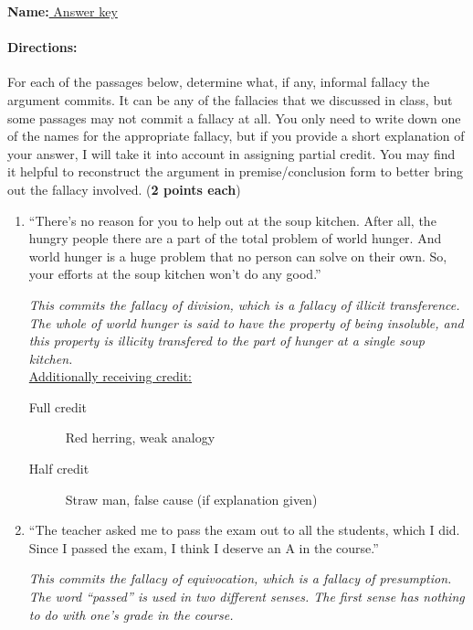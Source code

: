 \documentclass[10pt]{article}
\begin{document}
\textbf{Name:}\underline{  Answer key  }

\paragraph{Directions:} For each of the passages below, determine what, if any, informal fallacy the argument commits.  It can be any of the fallacies that we discussed in class, but some passages may not commit a fallacy at all.  You only need to write down one of the names for the appropriate fallacy, but if you provide a short explanation of your answer, I will take it into account in assigning partial credit.  You may find it helpful to reconstruct the argument in premise/conclusion form to better bring out the fallacy involved. (\textbf{2 points each})

\begin{enumerate}
  \setlength\itemsep{25pt}

  \item ``There's no reason for you to help out at the soup kitchen.  After all, the hungry people there are a part of the total problem of world hunger.  And world hunger is a huge problem that no person can solve on their own. So, your efforts at the soup kitchen won't do any good.''
  
  \textit{This commits the fallacy of division, which is a fallacy of illicit transference.  The whole of world hunger is said to have the property of being insoluble, and this property is illicity transfered to the part of hunger at a single soup kitchen.}
  \\
  
  \underline{Additionally receiving credit:} 
 \begin{description}
  \item [Full credit] Red herring, weak analogy
  \item [Half credit] Straw man, false cause (if explanation given)
 \end{description}


  \item ``The teacher asked me to pass the exam out to all the students, which I did.  Since I passed the exam, I think I deserve an A in the course.''
  
  \textit{This commits the fallacy of equivocation, which is a fallacy of presumption.  The word ``passed'' is used in two different senses. The first sense has nothing to do with one's grade in the course.}
  \\
  

\end{enumerate}
\end{document}

